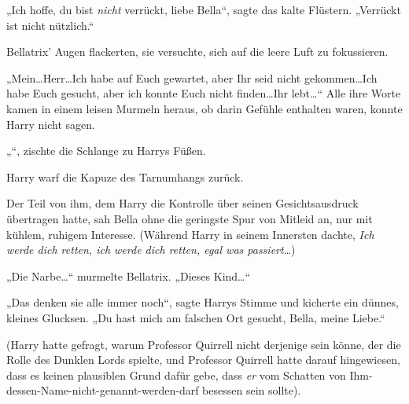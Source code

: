 „Ich hoffe, du bist \emph{nicht} verrückt, liebe Bella“, sagte das kalte Flüstern. „Verrückt ist nicht nützlich.“

Bellatrix’ Augen flackerten, sie versuchte, sich auf die leere Luft zu fokussieren.

„Mein…Herr…Ich habe auf Euch gewartet, aber Ihr seid nicht gekommen…Ich habe Euch gesucht, aber ich konnte Euch nicht finden…Ihr lebt…“ Alle ihre Worte kamen in einem leisen Murmeln heraus, ob darin Gefühle enthalten waren, konnte Harry nicht sagen.

„“, zischte die Schlange zu Harrys Füßen.

Harry warf die Kapuze des Tarnumhangs zurück.

Der Teil von ihm, dem Harry die Kontrolle über seinen Gesichtsausdruck übertragen hatte, sah Bella ohne die geringste Spur von Mitleid an, nur mit kühlem, ruhigem Interesse. (Während Harry in seinem Innersten dachte, \emph{Ich werde dich retten, ich werde dich retten, egal was passiert}…)

„Die Narbe…“ murmelte Bellatrix. „Dieses Kind…“

„Das denken sie alle immer noch“, sagte Harrys Stimme und kicherte ein dünnes, kleines Glucksen. „Du hast mich am falschen Ort gesucht, Bella, meine Liebe.“

(Harry hatte gefragt, warum Professor Quirrell nicht derjenige sein könne, der die Rolle des Dunklen Lords spielte, und Professor Quirrell hatte darauf hingewiesen, dass es keinen plausiblen Grund dafür gebe, dass \emph{er} vom Schatten von Ihm-dessen-Name-nicht-genannt-werden-darf besessen sein sollte).

